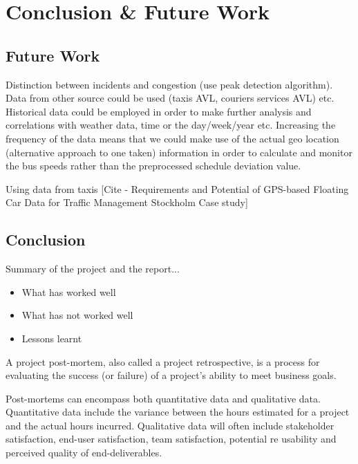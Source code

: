 \chapter{Conclusion \& Future Work}

\section{Future Work}
Distinction between incidents and congestion (use peak detection algorithm).
Data from other source could be used (taxis AVL, couriers services AVL) etc.
Historical data could be employed in order to make further analysis and correlations with weather data, time or the day/week/year etc.
Increasing the frequency of the data means that we could make use of the actual geo location (alternative approach to one taken) information in order to calculate and monitor the bus speeds rather than the preprocessed schedule deviation value.

Using data from taxis [Cite - Requirements and Potential of GPS-based Floating Car Data for Traffic Management Stockholm Case study]

\section{Conclusion}
Summary of the project and the report...

\begin{itemize}
	\item What has worked well
	\item What has not worked well
	\item Lessons learnt
\end{itemize}

A project post-mortem, also called a project retrospective, is a process for evaluating the success (or failure) of a project's ability to meet business goals. 

Post-mortems can encompass both quantitative data and qualitative data. Quantitative data include the variance between the hours estimated for a project and the actual hours incurred. Qualitative data will often include stakeholder satisfaction, end-user satisfaction, team satisfaction, potential re usability and perceived quality of end-deliverables.